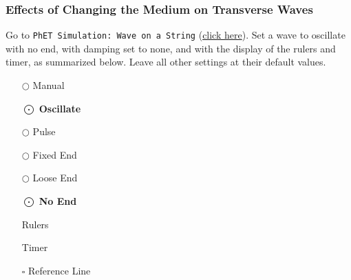 \documentclass[../main-physics-problems.tex]{subfiles}
\begin{document}
\subsubsection{Effects of Changing the Medium on Transverse Waves}
\begin{questions}

\question
Go to \texttt{PhET Simulation: Wave on a String} (\href{https://phet.colorado.edu/sims/html/wave-on-a-string/latest/wave-on-a-string_all.html}{click here}). Set a wave to oscillate with no end, with damping set to none, and with the display of the rulers and timer, as summarized below. Leave all other settings at their default values.

\begin{center}
\begin{minipage}{0.15\textwidth}
\begin{itemize}
    \item[$\bigcirc$] Manual 
    \item[$\bigodot$] \textbf{Oscillate}
    \item[$\bigcirc$] Pulse
\end{itemize}
\end{minipage}%
\hspace{1ex}
\begin{minipage}{0.3\textwidth}
\centering
{}
\end{minipage}%
\hspace{1ex}
\begin{minipage}{0.15\textwidth}
\centering
\begin{itemize}
    \item[$\bigcirc$] Fixed End 
    \item[$\bigcirc$] Loose End
    \item[$\bigodot$] \textbf{No End}
\end{itemize}
\end{minipage}%
\hspace{1ex}
\begin{minipage}{0.2\textwidth}
\begin{itemize}
    \item[\checkbox{1}] Rulers
    \item[\checkbox{1}] Timer
    \item[$\square$] Reference Line
\end{itemize}
\end{minipage}
\end{center}


\end{questions}
\end{document}
